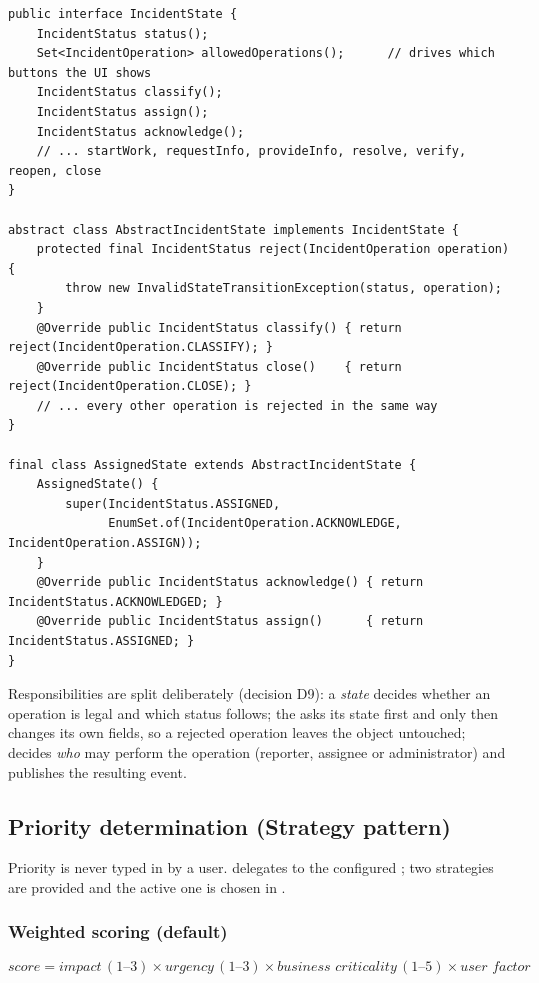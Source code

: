 \begin{lstlisting}[caption={The state contract and its default ``reject everything'' base class}]
public interface IncidentState {
    IncidentStatus status();
    Set<IncidentOperation> allowedOperations();      // drives which buttons the UI shows
    IncidentStatus classify();
    IncidentStatus assign();
    IncidentStatus acknowledge();
    // ... startWork, requestInfo, provideInfo, resolve, verify, reopen, close
}

abstract class AbstractIncidentState implements IncidentState {
    protected final IncidentStatus reject(IncidentOperation operation) {
        throw new InvalidStateTransitionException(status, operation);
    }
    @Override public IncidentStatus classify() { return reject(IncidentOperation.CLASSIFY); }
    @Override public IncidentStatus close()    { return reject(IncidentOperation.CLOSE); }
    // ... every other operation is rejected in the same way
}

final class AssignedState extends AbstractIncidentState {
    AssignedState() {
        super(IncidentStatus.ASSIGNED,
              EnumSet.of(IncidentOperation.ACKNOWLEDGE, IncidentOperation.ASSIGN));
    }
    @Override public IncidentStatus acknowledge() { return IncidentStatus.ACKNOWLEDGED; }
    @Override public IncidentStatus assign()      { return IncidentStatus.ASSIGNED; }
}
\end{lstlisting}

Responsibilities are split deliberately (decision D9): a \emph{state} decides whether an operation is legal and which status follows; the  asks its state first and only then changes its own fields, so a rejected operation leaves the object untouched;  decides \emph{who} may perform the operation (reporter, assignee or administrator) and publishes the resulting event.

\subsection{Priority determination (Strategy pattern)}
Priority is never typed in by a user.  delegates to the configured ; two strategies are provided and the active one is chosen in .

\subsubsection*{Weighted scoring (default)}
\[ \textit{score} = \textit{impact}\,(1\text{--}3) \times \textit{urgency}\,(1\text{--}3) \times \textit{business criticality}\,(1\text{--}5) \times \textit{user factor} \]

